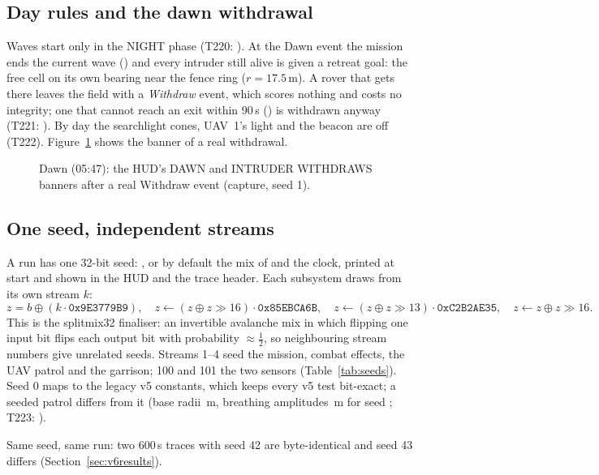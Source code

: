 \subsection{Day rules and the dawn withdrawal}
Waves start only in the NIGHT phase (T220: ). At the Dawn event the mission ends the current wave () and every intruder still alive is given a retreat goal: the free cell on its own bearing near the fence ring ($r=17.5$\,m). A rover that gets there leaves the field with a \emph{Withdraw} event, which scores nothing and costs no integrity; one that cannot reach an exit within 90\,s () is withdrawn anyway (T221: ). By day the searchlight cones, UAV~1's light and the beacon are off (T222). Figure~\ref{fig:dawn} shows the banner of a real withdrawal.
\begin{figure}[h]
\centering
{}
\caption{Dawn (05:47): the HUD's DAWN and INTRUDER WITHDRAWS banners after a real Withdraw event (capture, seed 1).}\label{fig:dawn}
\end{figure}

\subsection{One seed, independent streams}
A run has one 32-bit seed: , or by default the mix of  and the clock, printed at start and shown in the HUD and the trace header. Each subsystem draws from its own stream $k$:
\begin{equation}
z=b\oplus(k\cdot\texttt{0x9E3779B9}),\quad z\leftarrow(z\oplus z\gg16)\cdot\texttt{0x85EBCA6B},\quad z\leftarrow(z\oplus z\gg13)\cdot\texttt{0xC2B2AE35},\quad z\leftarrow z\oplus z\gg16 .
\end{equation}
This is the splitmix32 finaliser: an invertible avalanche mix in which flipping one input bit flips each output bit with probability $\approx\tfrac12$, so neighbouring stream numbers give unrelated seeds. Streams 1--4 seed the mission, combat effects, the UAV patrol and the garrison; 100 and 101 the two sensors (Table~\ref{tab:seeds}). Seed 0 maps to the legacy v5 constants, which keeps every v5 test bit-exact; a seeded patrol differs from it (base radii \patrolRadii\,m, breathing amplitudes \patrolAmps\,m for seed \seedBase; T223: ).
\begin{table}[h]
\centering\small
\caption{Derived stream seeds for the example base seed (generated from ).}\label{tab:seeds}
\tabSeeds
\end{table}
\lstDeriveSeed
Same seed, same run: two 600\,s traces with seed 42 are byte-identical and seed 43 differs (Section~\ref{sec:v6results}).
